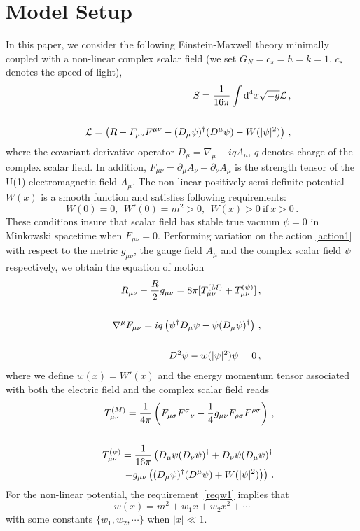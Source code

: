 \documentclass[pr, twocolumn, preprintnumbers, showpacs,footnoteadded, superscriptaddress,nofootinbib,longbibliography]{revtex4-1}
\newcommand{\td}{\mathrm{d}}
\begin{document}
\section{Model Setup}\label{modelset}
In this paper, we consider the following Einstein-Maxwell theory minimally coupled with a non-linear complex scalar field (we set $G_N=c_s=\hbar=k=1$, $c_s$ denotes the speed of light),
%
\begin{eqnarray}\label{action1}
&&S=\frac1{16\pi}\int\td^4x\sqrt{-g} {\cal L}  \, , \cr
~\cr
&&{\cal L}=\left(R-F_{\mu\nu}F^{\mu\nu}-(D_\mu\psi)^\dagger(D^\mu\psi)-W(|\psi|^2)\right) \, ,
\end{eqnarray}
%
where the covariant derivative operator $D_{\mu}=\nabla_\mu-iqA_\mu$, $q$ denotes charge of the complex scalar field.  In addition, $F_{\mu\nu}=\partial_\mu A_{\nu}-\partial_\nu A_{\mu}$ is the strength tensor of the U(1) electromagnetic field $A_{\mu}$. The non-linear positively semi-definite potential $W(x)$ is a smooth function and satisfies following requirements:
%
\begin{equation}\label{reqw1}
W(0)=0,~~W'(0)=m^2>0,~~W(x)>0~\text{if}~x>0\,.
\end{equation}
%
These conditions insure that scalar field has stable true vacuum $\psi=0$ in Minkowski spacetime when $F_{\mu\nu}=0$. Performing variation on the action \eqref{action1} with respect to the metric $g_{\mu\nu}$, the gauge field $A_\mu$ and the complex scalar field $\psi$ respectively, we obtain the equation of motion
%
\begin{eqnarray}\label{eom}
&&R_{\mu\nu}-\frac{R}2g_{\mu\nu}=8\pi [T^{(M)}_{\mu\nu}+T^{(\psi)}_{\mu\nu}]\,,  \cr
&& ~ \cr
&&\nabla^\mu F_{\mu\nu}=iq\left(\psi^\dagger D_\mu\psi-\psi (D_\mu\psi)^\dagger\right) \, , \cr
&& ~ \cr
&&D^2\psi-w(|\psi|^2)\psi=0\, ,
\end{eqnarray}
%
where we define $w(x)=W'(x)$ and the energy momentum tensor associated with both the electric field and the complex scalar field reads
%
\begin{eqnarray}\label{Energy}
&&T^{(M)}_{\mu\nu}=\frac1{4\pi}\left(F_{\mu\sigma}{F^{\sigma}}_\nu-\frac14g_{\mu\nu}F_{\rho\sigma}F^{\rho\sigma}\right)\, , \cr
~\cr
&&T^{(\psi)}_{\mu\nu}=\frac1{16\pi}
\left( D_\mu\psi(D_\nu\psi)^\dagger+D_\nu\psi(D_\mu\psi)^\dagger \right. \cr
&&\left.-g_{\mu\nu}\left((D_\mu\psi)^\dagger(D^\mu\psi)+W(|\psi|^2)\right)\right )\, .
 \end{eqnarray}
For the non-linear potential, the requirement~\eqref{reqw1} implies that
%
\begin{equation}\label{smallxw}
w(x)=m^2+w_1x+w_2x^2+\cdots
\end{equation}
%
with some constants $\{w_1,w_2,\cdots\}$  when $|x|\ll1$.
\end{document}
